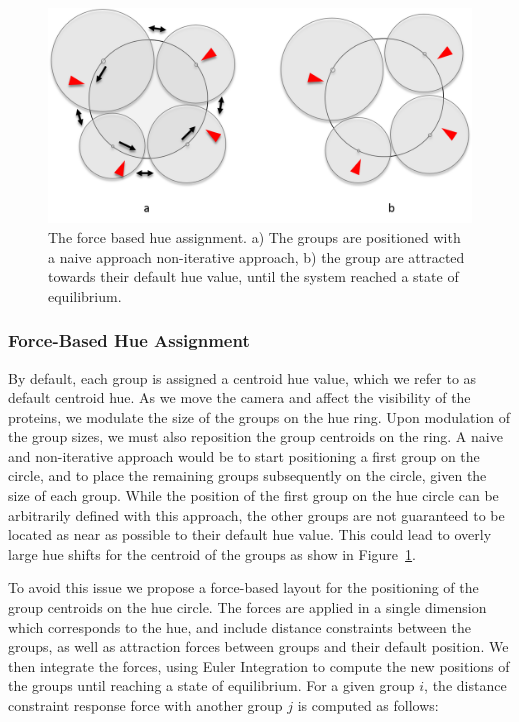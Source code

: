 \documentclass[review,journal]{vgtc}         %
\begin{document}
	\begin{figure}
		\centering
		\includegraphics[width=0.9\linewidth]{"Figures/force-based layout"}
		\caption{The force based hue assignment. a) The groups are positioned with a naive approach non-iterative approach, b) the group are attracted towards their default hue value, until the system reached a state of equilibrium.}
		\label{fig:force-basedlayout}
	\end{figure}
	
	\subsubsection{Force-Based Hue Assignment}
	
	By default, each group is assigned a centroid hue value, which we refer to as default centroid hue.
	As we move the camera and affect the visibility of the proteins, we modulate the size of the groups on the hue ring.
	Upon modulation of the group sizes, we must also reposition the group centroids on the ring.
	A naive and non-iterative approach would be to start positioning a first group on the circle, and to place the remaining groups subsequently on the circle, given the size of each group.
	While the position of the first group on the hue circle can be arbitrarily defined with this approach, the other groups are not guaranteed to be located as near as possible to their default hue value.
	This could lead to overly large hue shifts for the centroid of the groups as show in Figure~\ref{fig:force-basedlayout}.
	
	To avoid this issue we propose a force-based layout for the positioning of the group centroids on the hue circle.
	The forces are applied in a single dimension which corresponds to the hue, and include distance constraints between the groups, as well as attraction forces between groups and their default position.
	We then integrate the forces, using Euler Integration to compute the new positions of the groups until reaching a state of equilibrium.
	For a given group $i$, the distance constraint response force with another group $j$ is computed as follows:
	
\end{document}
